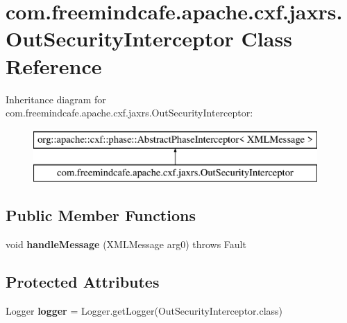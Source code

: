 \hypertarget{classcom_1_1freemindcafe_1_1apache_1_1cxf_1_1jaxrs_1_1_out_security_interceptor}{}\section{com.\+freemindcafe.\+apache.\+cxf.\+jaxrs.\+Out\+Security\+Interceptor Class Reference}
\label{classcom_1_1freemindcafe_1_1apache_1_1cxf_1_1jaxrs_1_1_out_security_interceptor}
Inheritance diagram for com.\+freemindcafe.\+apache.\+cxf.\+jaxrs.\+Out\+Security\+Interceptor\+:\begin{figure}[H]
\begin{center}
\leavevmode
\includegraphics[height=2.000000cm]{classcom_1_1freemindcafe_1_1apache_1_1cxf_1_1jaxrs_1_1_out_security_interceptor}
\end{center}
\end{figure}
\subsection*{Public Member Functions}
\begin{DoxyCompactItemize}
\item 
\hypertarget{classcom_1_1freemindcafe_1_1apache_1_1cxf_1_1jaxrs_1_1_out_security_interceptor_a5b19eca485be1b5107ee2a943833d8d4}{}void {\bfseries handle\+Message} (X\+M\+L\+Message arg0)  throws Fault \label{classcom_1_1freemindcafe_1_1apache_1_1cxf_1_1jaxrs_1_1_out_security_interceptor_a5b19eca485be1b5107ee2a943833d8d4}

\end{DoxyCompactItemize}
\subsection*{Protected Attributes}
\begin{DoxyCompactItemize}
\item 
\hypertarget{classcom_1_1freemindcafe_1_1apache_1_1cxf_1_1jaxrs_1_1_out_security_interceptor_a48706de8381fd84b6d640b2f3384c9e2}{}Logger {\bfseries logger} = Logger.\+get\+Logger(Out\+Security\+Interceptor.\+class)\label{classcom_1_1freemindcafe_1_1apache_1_1cxf_1_1jaxrs_1_1_out_security_interceptor_a48706de8381fd84b6d640b2f3384c9e2}

\end{DoxyCompactItemize}


